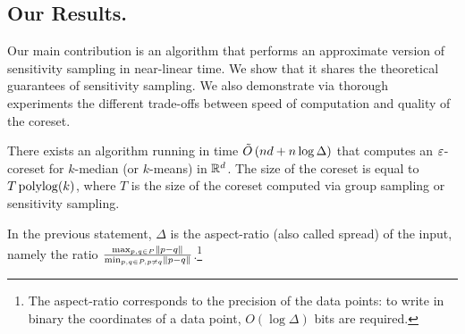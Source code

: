 %

\subsection{Our Results.}

Our main contribution is an algorithm that performs an approximate version of sensitivity sampling in near-linear time. We show that it shares the theoretical guarantees of sensitivity sampling. We also demonstrate via thorough experiments the different trade-offs between speed of computation and quality of the coreset.

\begin{theorem}\label{thm:main}
There exists an algorithm running in time $\tilde O\left( nd + n \log \Delta\right)$  that computes an $\varepsilon$-coreset for $k$-median (or $k$-means) in $\mathbb{R}^d$. The size of the coreset is equal to $T \operatorname{polylog}(k)$, where $T$ is the size of the coreset computed via group sampling or sensitivity sampling.
\end{theorem}
In the previous statement, $\Delta$ is the aspect-ratio (also called spread) of the input, namely the ratio $\frac{\max_{p, q \in P} \left\| p-q\right\|}{\min_{p, q \in P, p \neq q} \left\| p-q\right\|}$.\footnote{The aspect-ratio corresponds to the precision of the data points: to write in binary the coordinates of a data point, $O(\log \Delta)$ bits are required.}

